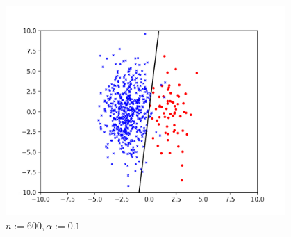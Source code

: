 \documentclass[11pt,a4paper,dvipdfmx]{article}
\theoremstyle{plain}
\newcommand{\1}{\mbox{1}\hspace{-0.25em}\mbox{l}}
\begin{document}
\begin{figure}[H]
  \centering
    \includegraphics[height=8cm]{image/Figure_1.png}
    \caption{\footnotesize $n := 600, \alpha := 0.1$}
    \label{fig:prob1}
\end{figure}
\end{document}
